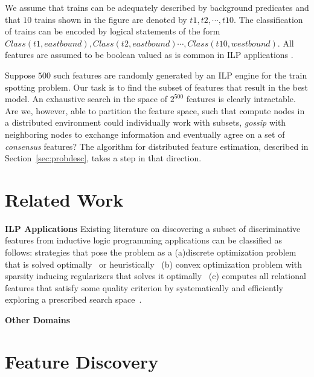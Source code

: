 We assume that trains can be adequately described by background predicates and that $10$ trains shown in the figure are denoted by $t1, t2, \cdots, t10$. The classification of trains can be encoded by logical statements of the form $Class(t1,eastbound),Class(t2,eastbound) \cdots, Class(t10,westbound)$. All features are assumed to be boolean valued as is common in ILP applications \cite{Specia_09}.

Suppose $500$ such features are randomly generated by an ILP engine for the train spotting problem. Our task is to find the subset of features that result in the best model. An exhaustive search in the space of $2^{500}$ features is clearly intractable. Are we, however, able to partition the feature space, such that compute nodes in a distributed environment could individually work with subsets, \emph{gossip} with neighboring nodes to exchange information and eventually agree on a set of \emph{consensus} features? The algorithm for distributed feature estimation, described in Section~\ref{sec:probdesc}, takes a step in that direction.

\section{Related Work}
\label{sec:related}

\noindent \textbf{ILP Applications }Existing literature on discovering a subset of discriminative features from inductive logic programming applications can be classified as follows: strategies that pose the problem as a (a)discrete optimization problem that is solved optimally~\cite{l1Reg,cvpr2007,nips2004} or heuristically~\cite{JoshiRS08,Amrita12,NageshRCKDB12,ChalamallaNSR08,SpeciaSJRN09,RamakrishnanJBS07,SpeciaSRN06} (b) convex optimization problem with sparsity inducing regularizers that solves it optimally~\cite{JawanpuriaNR11,NairSRK12} (c) computes all relational features that satisfy some quality criterion by systematically and efficiently exploring a prescribed search space~\cite{pei2004,subseqGap2006,bitSpade,antunes2003,han2005,rakesh1995,han2004,gehrke2002,rastogi1999}.

  
\noindent \textbf{Other Domains }
\section{Feature Discovery}
\label{sec:ilp}

